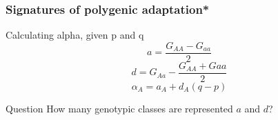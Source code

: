 \begin{frame}
\frametitle{Signatures of polygenic adaptation*}
\begin{block}{Calculating alpha, given p and q}
\centering
\begin{equation}
a = \frac{G_{AA} - G_{aa}}{2}	
\end{equation}
\begin{equation}
d = G_{Aa} - \frac{G_{AA}+G{aa}}{2}	
\end{equation}
\begin{equation}
\alpha_A = a_A + d_A(q-p)	
\end{equation}
\end{block}
\tiny
\citet{Cheverud:2015tc}
\normalsize
\begin{block}{Question}
How many genotypic classes are represented  $a$ and $d$?
\end{block}

\end{frame}




































